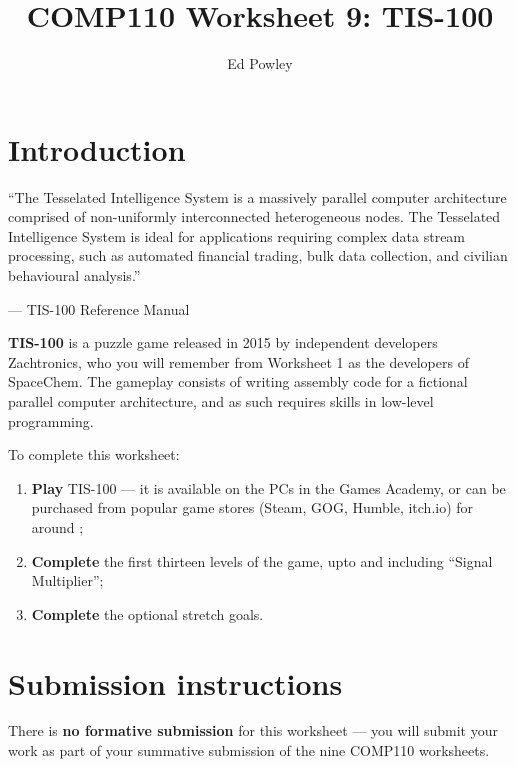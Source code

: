 \documentclass{../../../fal_assignment}
\title{COMP110 Worksheet 9: TIS-100}
\author{Ed Powley}
\begin{document}
\maketitle

\section*{Introduction}

\begin{marginquote}
``The Tesselated Intelligence System is a massively parallel computer architecture comprised of non-uniformly
interconnected heterogeneous nodes. The Tesselated Intelligence System is ideal for applications requiring complex
data stream processing, such as automated financial trading, bulk data collection, and civilian behavioural analysis.''

--- TIS-100 Reference Manual
\end{marginquote}

\textbf{TIS-100} is a puzzle game released in 2015 by independent developers Zachtronics,
who you will remember from Worksheet 1 as the developers of SpaceChem.
The gameplay consists of writing assembly code for a fictional parallel computer architecture,
and as such requires skills in low-level programming.

To complete this worksheet:
\begin{enumerate}[label=(\alph*)]
	\item \textbf{Play} TIS-100 --- it is available on the PCs in the Games Academy, or can be purchased from popular game stores (Steam, GOG, Humble, itch.io) for around ;
 	\item \textbf{Complete} the first thirteen levels of the game, upto and including ``Signal Multiplier'';
 	\item \textbf{Complete} the optional stretch goals.
\end{enumerate}

\section*{Submission instructions}

There is \textbf{no formative submission} for this worksheet --- you will submit your work as part of your summative submission of the nine COMP110 worksheets.
\end{document}
